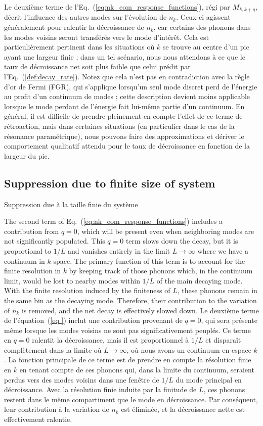 \documentclass[aps,prd,notitlepage,amsfonts,amssymb,amsmath,nofootinbib,superscriptaddress,longbibliography]{revtex4-2}
\newcommand{\trad}[1]{\textcolor{tradcolor}{#1}}
\begin{document}
{Le deuxième terme de l'Eq.~(\ref{eq:nk_eom_response_functions}), régi par $M_{k,k+q}$, décrit l'influence des autres modes sur l'évolution de $n_{k}$. Ceux-ci agissent généralement pour ralentir la décroissance de $n_{k}$, car certains des phonons dans les modes voisins seront transférés vers le mode d'intérêt. Cela est particulièrement pertinent dans les situations où $k$ se trouve au centre d'un pic ayant une largeur finie ; dans un tel scénario, nous nous attendons à ce que le taux de décroissance net soit plus faible que celui prédit par l'Eq.~(\ref{def:decay_rate}).
Notez que cela n'est pas en contradiction avec la règle d'or de Fermi (FGR), qui s'applique lorsqu'un seul mode discret perd de l'énergie au profit d'un continuum de modes ; cette description devient moins applicable lorsque le mode perdant de l'énergie fait lui-même partie d'un continuum.
En général, il est difficile de prendre pleinement en compte l'effet de ce terme de rétroaction, mais dans certaines situations (en particulier dans le cas de la résonance paramétrique), nous pouvons faire des approximations et dériver le comportement qualitatif attendu pour le taux de décroissance en fonction de la largeur du pic.
}



\subsection{Suppression due to finite size of system
\label{subsec:Finite-size}}
\trad{Suppression due à la taille finie du système}

 The second term of Eq.~(\ref{eq:nk_eom_response_functions}) includes a contribution from $q=0$, which will be present even when neighboring modes are not significantly populated.  
This $q=0$ term slows down the decay, but it is proportional to $1/L$ and vanishes entirely in the limit $L \to \infty$ where we have a continuum in $k$-space.
The primary function of this term is to account for the finite resolution in $k$ by keeping track of those phonons which, in the continuum limit, would be lost to nearby modes within $1/L$ of the main decaying mode.  With the finite resolution induced by the finiteness of $L$, these phonons remain in the same bin as the decaying mode. Therefore, their contribution to the variation of $n_k$ is removed, and the net decay is effectively slowed down.
\trad{Le deuxième terme de l'équation~(\ref{eq
}) inclut une contribution provenant de $q=0$, qui sera présente même lorsque les modes voisins ne sont pas significativement peuplés. 
Ce terme en $q=0$ ralentit la décroissance, mais il est proportionnel à $1/L$ et disparaît complètement dans la limite où $L \to \infty$, où nous avons un continuum en espace $k$. 
La fonction principale de ce terme est de prendre en compte la résolution finie en $k$ en tenant compte de ces phonons qui, dans la limite du continuum, seraient perdus vers des modes voisins dans une fenêtre de $1/L$ du mode principal en décroissance. Avec la résolution finie induite par la finitude de $L$, ces phonons restent dans le même compartiment que le mode en décroissance. Par conséquent, leur contribution à la variation de $n_k$ est éliminée, et la décroissance nette est effectivement ralentie.}
\end{document}
